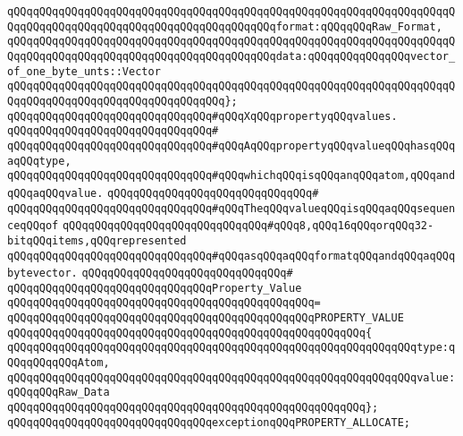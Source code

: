 \verb|qQQqqQQqqQQqqQQqqQQqqQQqqQQqqQQqqQQqqQQqqQQqqQQqqQQqqQQqqQQqqQQqqQQqqQQqqQQqqQQqqQQqqQQqqQQqqQQqqQQqqQQqqQQqqQQqformat:qQQqqQQqRaw_Format,|\newline
\verb|qQQqqQQqqQQqqQQqqQQqqQQqqQQqqQQqqQQqqQQqqQQqqQQqqQQqqQQqqQQqqQQqqQQqqQQqqQQqqQQqqQQqqQQqqQQqqQQqqQQqqQQqqQQqqQQqdata:qQQqqQQqqQQqqQQqvector_of_one_byte_unts::Vector|\newline
\verb|qQQqqQQqqQQqqQQqqQQqqQQqqQQqqQQqqQQqqQQqqQQqqQQqqQQqqQQqqQQqqQQqqQQqqQQqqQQqqQQqqQQqqQQqqQQqqQQqqQQqqQQq};|\newline
\newline
\verb|qQQqqQQqqQQqqQQqqQQqqQQqqQQqqQQq#qQQqXqQQqpropertyqQQqvalues.|\newline
\verb|qQQqqQQqqQQqqQQqqQQqqQQqqQQqqQQq#|\newline
\verb|qQQqqQQqqQQqqQQqqQQqqQQqqQQqqQQq#qQQqAqQQqpropertyqQQqvalueqQQqhasqQQqaqQQqtype,|\newline
\verb|qQQqqQQqqQQqqQQqqQQqqQQqqQQqqQQq#qQQqwhichqQQqisqQQqanqQQqatom,qQQqandqQQqaqQQqvalue.|\newline
\verb|qQQqqQQqqQQqqQQqqQQqqQQqqQQqqQQq#|\newline
\verb|qQQqqQQqqQQqqQQqqQQqqQQqqQQqqQQq#qQQqTheqQQqvalueqQQqisqQQqaqQQqsequenceqQQqof|\newline
\verb|qQQqqQQqqQQqqQQqqQQqqQQqqQQqqQQq#qQQq8,qQQq16qQQqorqQQq32-bitqQQqitems,qQQqrepresented|\newline
\verb|qQQqqQQqqQQqqQQqqQQqqQQqqQQqqQQq#qQQqasqQQqaqQQqformatqQQqandqQQqaqQQqbytevector.|\newline
\verb|qQQqqQQqqQQqqQQqqQQqqQQqqQQqqQQq#|\newline
\verb|qQQqqQQqqQQqqQQqqQQqqQQqqQQqqQQqProperty_Value|\newline
\verb|qQQqqQQqqQQqqQQqqQQqqQQqqQQqqQQqqQQqqQQqqQQqqQQq=|\newline
\verb|qQQqqQQqqQQqqQQqqQQqqQQqqQQqqQQqqQQqqQQqqQQqqQQqPROPERTY_VALUE|\newline
\verb|qQQqqQQqqQQqqQQqqQQqqQQqqQQqqQQqqQQqqQQqqQQqqQQqqQQqqQQq{|\newline
\verb|qQQqqQQqqQQqqQQqqQQqqQQqqQQqqQQqqQQqqQQqqQQqqQQqqQQqqQQqqQQqqQQqtype:qQQqqQQqqQQqAtom,|\newline
\verb|qQQqqQQqqQQqqQQqqQQqqQQqqQQqqQQqqQQqqQQqqQQqqQQqqQQqqQQqqQQqqQQqvalue:qQQqqQQqRaw_Data|\newline
\verb|qQQqqQQqqQQqqQQqqQQqqQQqqQQqqQQqqQQqqQQqqQQqqQQqqQQqqQQq};|\newline
\newline
\verb|qQQqqQQqqQQqqQQqqQQqqQQqqQQqqQQqexceptionqQQqPROPERTY_ALLOCATE;|\newline
